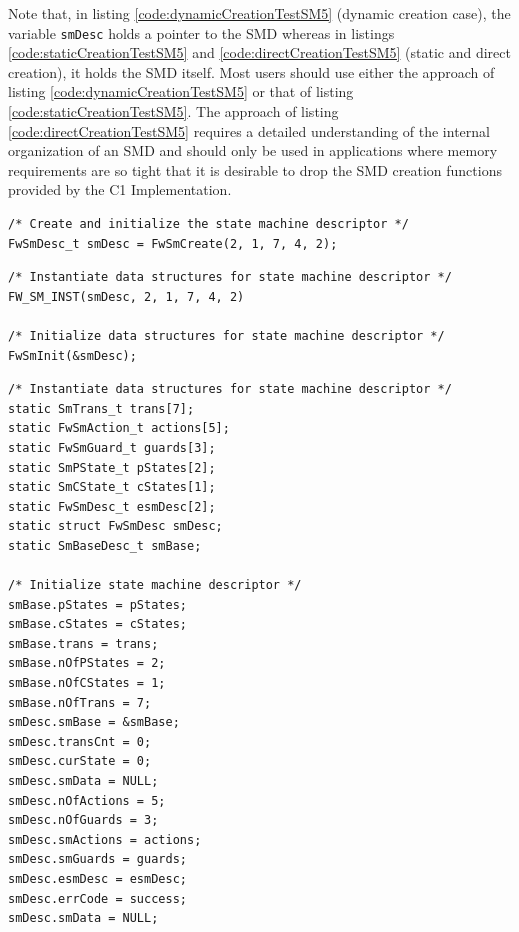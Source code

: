 \documentclass[a4paper,10pt]{article}
\begin{document}
Note that, in listing \ref{code:dynamicCreationTestSM5} (dynamic creation case), the variable \texttt{smDesc} holds a pointer to the SMD 
whereas in listings \ref{code:staticCreationTestSM5} and \ref{code:directCreationTestSM5} 
(static and direct creation), it holds the SMD itself. Most users should 
use either the approach of listing \ref{code:dynamicCreationTestSM5} or that of listing \ref{code:staticCreationTestSM5}. 
The approach of listing \ref{code:directCreationTestSM5} requires a detailed 
understanding of the internal organization of an SMD and should only be used in applications where memory 
requirements are so tight that it is desirable to drop the SMD creation functions provided by the C1 Implementation.

\begin{lstlisting}
/* Create and initialize the state machine descriptor */
FwSmDesc_t smDesc = FwSmCreate(2, 1, 7, 4, 2);
\end{lstlisting}

\begin{lstlisting}
/* Instantiate data structures for state machine descriptor */
FW_SM_INST(smDesc, 2, 1, 7, 4, 2)

/* Initialize data structures for state machine descriptor */
FwSmInit(&smDesc);
\end{lstlisting}

\begin{lstlisting}
/* Instantiate data structures for state machine descriptor */
static SmTrans_t trans[7];
static FwSmAction_t actions[5];
static FwSmGuard_t guards[3];
static SmPState_t pStates[2];
static SmCState_t cStates[1];
static FwSmDesc_t esmDesc[2];
static struct FwSmDesc smDesc;
static SmBaseDesc_t smBase;

/* Initialize state machine descriptor */
smBase.pStates = pStates;
smBase.cStates = cStates;
smBase.trans = trans;
smBase.nOfPStates = 2;
smBase.nOfCStates = 1;
smBase.nOfTrans = 7;
smDesc.smBase = &smBase;
smDesc.transCnt = 0;
smDesc.curState = 0;
smDesc.smData = NULL;
smDesc.nOfActions = 5;
smDesc.nOfGuards = 3;
smDesc.smActions = actions;
smDesc.smGuards = guards;
smDesc.esmDesc = esmDesc;
smDesc.errCode = success;
smDesc.smData = NULL;
\end{lstlisting}
\end{document}

